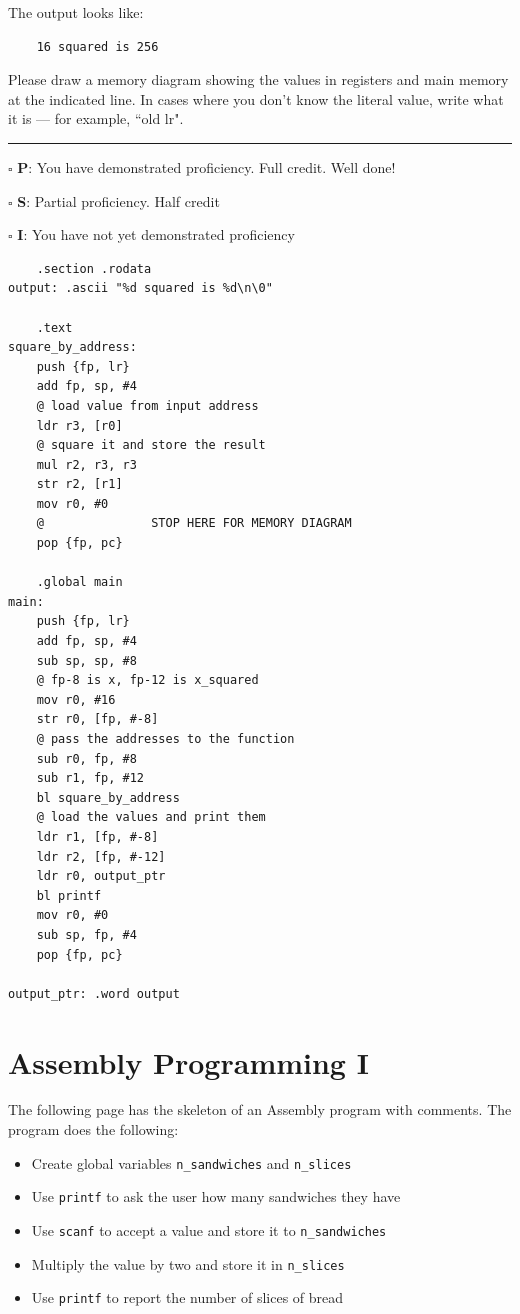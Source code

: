 \documentclass[12pt]{article}
\begin{document}
The output looks like:
\begin{verbatim}
    16 squared is 256
\end{verbatim}

Please draw a memory diagram showing the values in registers and main memory at the indicated line. In cases where you don't know the literal value, write what it is --- for example, ``old lr". 


\vfill

\rule[1ex]{\textwidth}{.1pt}

$\square$ \textbf{P}: You have demonstrated proficiency. Full credit. Well done!

$\square$ \textbf{S}: Partial proficiency. Half credit

$\square$ \textbf{I}: You have not yet demonstrated proficiency

\newpage

\begin{verbatim}
    .section .rodata
output: .ascii "%d squared is %d\n\0"

    .text
square_by_address:
    push {fp, lr}
    add fp, sp, #4
    @ load value from input address
    ldr r3, [r0]
    @ square it and store the result
    mul r2, r3, r3
    str r2, [r1]
    mov r0, #0
    @               STOP HERE FOR MEMORY DIAGRAM
    pop {fp, pc}

    .global main
main: 
    push {fp, lr}
    add fp, sp, #4
    sub sp, sp, #8
    @ fp-8 is x, fp-12 is x_squared
    mov r0, #16
    str r0, [fp, #-8]
    @ pass the addresses to the function
    sub r0, fp, #8
    sub r1, fp, #12
    bl square_by_address
    @ load the values and print them
    ldr r1, [fp, #-8]
    ldr r2, [fp, #-12]
    ldr r0, output_ptr
    bl printf
    mov r0, #0
    sub sp, fp, #4
    pop {fp, pc}

output_ptr: .word output
\end{verbatim}



\section*{Assembly Programming I}

The following page has the skeleton of an Assembly program with comments. The program does the following:
\begin{itemize}
    \item Create global variables \texttt{n\_sandwiches} and \texttt{n\_slices}
    \item Use \texttt{printf} to ask the user how many sandwiches they have
    \item Use \texttt{scanf} to accept a value and store it to \texttt{n\_sandwiches}
    \item Multiply the value by two and store it in \texttt{n\_slices}
    \item Use \texttt{printf} to report the number of slices of bread
\end{itemize}
\end{document}
